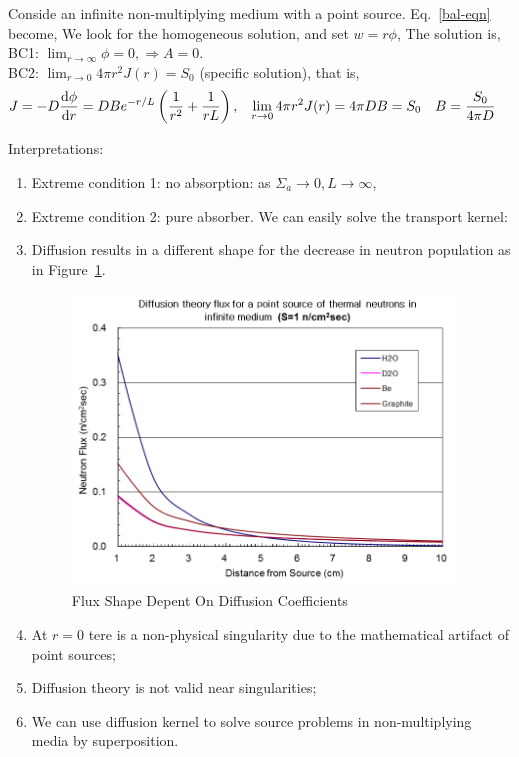 \documentclass{school-22.211-notes}
\begin{document}
\clearpage
{}
Conside an infinite non-multiplying medium with a point source. Eq.~\ref{bal-eqn} become,
We look for the homogeneous solution, and set $w = r \phi$, 
The solution is, 
BC1: $\lim_{r\to \infty} \phi = 0, \Rightarrow A=0$.\\
 BC2: $\lim_{r\to 0} 4 \pi r^2 J(r) = S_0$ (specific solution), that is, 
\begin{align}
J &= -D \frac{\mathrm{d}\phi}{\mathrm{d}r} = DBe^{-r/L} \left( \frac{1}{r^2} + \frac{1}{rL} \right), 
&\lim_{r\to 0} 4 \pi r^2 J(r) &= 4 \pi DB = S_0 &B &= \frac{S_0}{4 \pi D}
\end{align}

Interpretations:
\begin{enumerate}
\item Extreme condition 1: no absorption: as $\Sigma_a \to 0, L\to \infty$, 
\item Extreme condition 2: pure absorber. We can easily solve the transport kernel: 
\item Diffusion results in a different shape for the decrease in neutron population as in Figure~\ref{dfs-shape}.
  \begin{figure}
    \centering
    \includegraphics[width=4in]{images/dfs/dfs-shape.png}
    \caption{Flux Shape Depent On Diffusion Coefficients}\label{dfs-shape}
  \end{figure}
\item At $r=0$ tere is a non-physical singularity due to the mathematical artifact of point sources;
\item Diffusion theory is not valid near singularities;
\item We can use diffusion kernel to solve source problems in non-multiplying media by superposition.
\end{enumerate}
\end{document}
